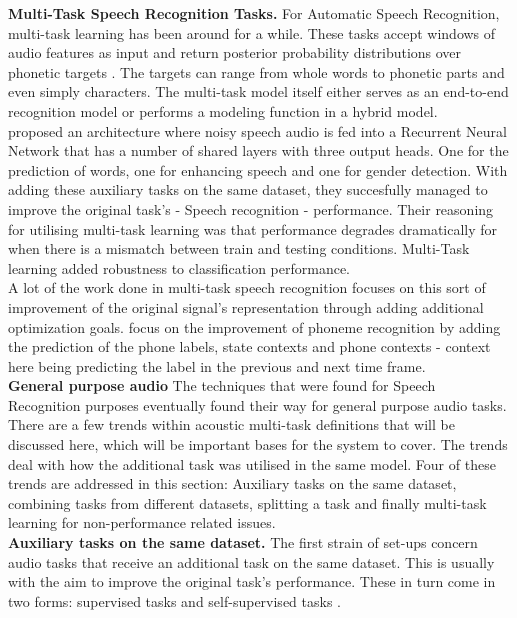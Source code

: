 \textbf{Multi-Task Speech Recognition Tasks.} For Automatic Speech Recognition, multi-task learning has been around for a while. These tasks accept windows of audio features as input and return posterior probability distributions over phonetic targets \citep{meyer2019multi}. The targets can range from whole words to phonetic parts and even simply characters. The multi-task model itself either serves as an end-to-end recognition model or performs a modeling function in a hybrid model. \\

\cite{lu2004multitask} proposed an architecture where noisy speech audio is fed into a Recurrent Neural Network that has a number of shared layers with three output heads. One for the prediction of words, one for enhancing speech and one for gender detection. With adding these auxiliary tasks on the same dataset, they succesfully managed to improve the original task's - Speech recognition - performance. Their reasoning for utilising multi-task learning was that performance degrades dramatically for when there is a mismatch between train and testing conditions. Multi-Task learning added robustness to classification performance. \\

A lot of the work done in multi-task speech recognition focuses on this sort of improvement of the original signal's representation through adding additional optimization goals. \cite{seltzer2013multi} focus on the improvement of phoneme recognition by adding the prediction of the phone labels, state contexts and phone contexts - context here being predicting the label in the previous and next time frame. \\

\textbf{General purpose audio} The techniques that were found for Speech Recognition purposes eventually found their way for general purpose audio tasks. There are a few trends within acoustic multi-task definitions that will be discussed here, which will be important bases for the system to cover.  The trends deal with how the additional task was utilised in the same model. Four of these trends are addressed in this section: Auxiliary tasks on the same dataset, combining tasks from different datasets, splitting a task and finally multi-task learning for non-performance related issues. \\

\textbf{Auxiliary tasks on the same dataset.} The first strain of set-ups concern audio tasks that receive an additional task on the same dataset. This is usually with the aim to improve the original task's performance. These in turn come in two forms: supervised tasks \citep{kim2017speech} \citep{zeng2019spectrogram} \citep{abrol2020learning} \citep{fernando2020temporarily} \citep{wu2020domain} \citep{sun2017compressed} \citep{lopez2019keyword} \citep{panchapagesan2016multi} and self-supervised tasks \citep{lee2019label}  \citep{deshmukh2020multi} \citep{pankajakshan2019polyphonic} \citep{lu2004multitask}.  \\

